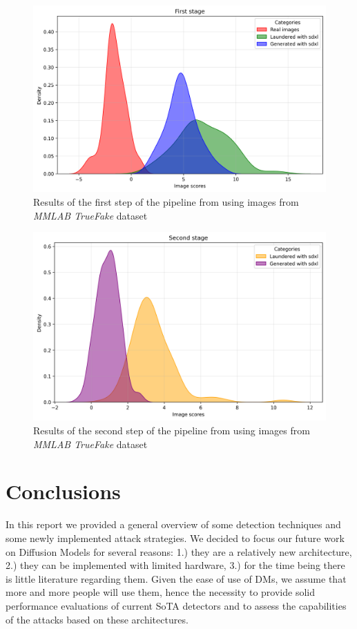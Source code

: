 \documentclass[conference]{IEEEtran} %
\begin{document}
    \begin{figure}[h]
        \centering
        \includegraphics[width=0.95\linewidth]{Img/first_stage.png}
        \caption{Results of the first step of the pipeline from \cite{mandelli2024synthetic} using images from \textit{MMLAB TrueFake} dataset}
        \label{fig:first_stage}
    \end{figure}

    \begin{figure}[h]
        \centering
        \includegraphics[width=0.95\linewidth]{Img/second_stage.png}
        \caption{Results of the second step of the pipeline from \cite{mandelli2024synthetic} using images from \textit{MMLAB TrueFake} dataset}
        \label{fig:second_stage}
    \end{figure}

\section{Conclusions}
    In this report we provided a general overview of some detection techniques and some newly implemented attack strategies. We decided to focus our future work on Diffusion Models for several reasons: 1.) they are a relatively new architecture, 2.) they can be implemented with limited hardware, 3.) for the time being there is little literature regarding them. Given the ease of use of DMs, we assume that more and more people will use them, hence the necessity to provide solid performance evaluations of current SoTA detectors and to assess the capabilities of the attacks based on these architectures.
\end{document}
